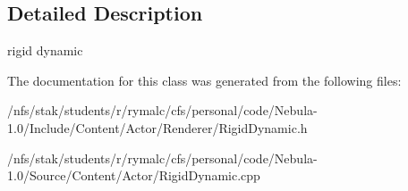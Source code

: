 \subsection{Detailed Description}
rigid dynamic 

The documentation for this class was generated from the following files:\begin{DoxyCompactItemize}
\item 
/nfs/stak/students/r/rymalc/cfs/personal/code/Nebula-\/1.0/Include/Content/Actor/Renderer/RigidDynamic.h\item 
/nfs/stak/students/r/rymalc/cfs/personal/code/Nebula-\/1.0/Source/Content/Actor/RigidDynamic.cpp\end{DoxyCompactItemize}

